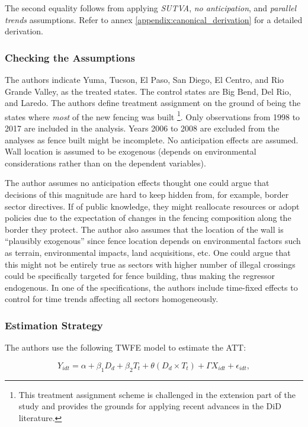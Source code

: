 \documentclass[titlepage]{article}
\theoremstyle{plain}
\theoremstyle{plain}
\begin{document}
The second equality follows from applying \textit{SUTVA}, \textit{no anticipation}, and \textit{parallel trends} assumptions. Refer to annex \ref{appendix:canonical_derivation} for a detailed derivation.

\subsubsection*{Checking the Assumptions}

The authors indicate Yuma, Tucson, El Paso, San Diego, El Centro, and Rio Grande Valley, as the treated states. The control states are Big Bend, Del Rio, and Laredo. The authors define treatment assignment on the ground of being the states where \textit{most} of the new fencing was built \footnote{This treatment assignment scheme is challenged in the extension part of the study and provides the grounds for applying recent advances in the DiD literature.}. Only observations from 1998 to 2017 are included in the analysis. Years 2006 to 2008 are excluded from the analyses as fence built might be incomplete. No anticipation effects are assumed. Wall location is assumed to be exogenous (depends on environmental considerations rather than on the dependent variables).

The author assumes no anticipation effects thought one could argue that decisions of this magnitude are hard to keep hidden from, for example, border sector directives. If of public knowledge, they might reallocate resources or adopt policies due to the expectation of changes in the fencing composition along the border they protect. The author also assumes that the location of the wall is \enquote{plausibly exogenous} since fence location depends on environmental factors such as terrain, environmental impacts, land acquisitions, etc. One could argue that this might not be entirely true as sectors with higher number of illegal crossings could be specifically targeted for fence building, thus making the regressor endogenous. In one of the specifications, the authors include time-fixed effects to control for time trends affecting all sectors homogeneously.


\subsubsection*{Estimation Strategy}

The authors use the following TWFE model to estimate the ATT:

\begin{equation}
	\label{eq:twfe_1}
    Y_{idt} = \alpha + \beta_{1}\textit{D}_{d} + \beta_{2}\textit{T}_{t} + \theta(\textit{D}_{d} \times \textit{T}_{t}) + \Gamma X_{idt} + \epsilon_{idt},
\end{equation}
\end{document}
